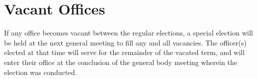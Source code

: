 \section{Vacant Offices} If any office becomes vacant between the regular elections, a special election will be held at the next general meeting to fill any and all vacancies. The officer(s) elected at that time will serve for the remainder of the vacated term, and will enter their office at the conclusion of the general body meeting wherein the election was conducted. %